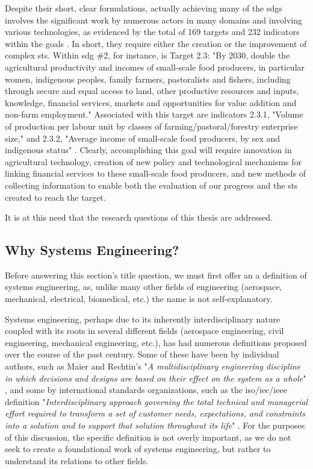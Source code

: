 Despite their short, clear formulations, actually achieving many of the \acp{sdg} involves the significant work by numerous actors in many domains and involving various technologies, as evidenced by the total of 169 targets and  232 indicators within the goals \cite{unitednationsgeneralassemblyGlobalIndicatorFramework2017}. In short, they require either the creation or the improvement of complex \ac{sts}. Within \ac{sdg} \#2, for instance, is Target 2.3: "By 2030, double the agricultural productivity and incomes of small-scale food producers, in particular women, indigenous peoples, family farmers, pastoralists and fishers, including through secure and equal access to land, other productive resources and inputs, knowledge, financial services, markets and opportunities for value addition and non-farm employment." Associated with this target are indicators 2.3.1, "Volume of production per labour unit by classes of farming/pastoral/forestry enterprise size," and 2.3.2, "Average income of small-scale food producers, by sex and indigenous status" \cite{unitednationsgeneralassemblyGlobalIndicatorFramework2017}. Clearly, accomplishing this goal will require innovation in agricultural technology, creation of new policy and technological mechanisms for linking financial services to these small-scale food producers, and new methods of collecting information to enable both the evaluation of our progress and the \ac{sts} created to reach the target. 

It is at this need that the research questions of this thesis are addressed.

\subsection{Why Systems Engineering?} \label{sec:se}

Before answering this section's title question, we must first offer an a definition of systems engineering, as, unlike many other fields of engineering (aerospace, mechanical, electrical, biomedical, etc.) the name is not self-explanatory. 

Systems engineering, perhaps due to its inherently interdisciplinary nature coupled with its roots in several different fields (aerospace engineering, civil engineering, mechanical engineering, etc.), has had numerous definitions proposed over the course of the past century. Some of these have been by individual authors, such as Maier and Rechtin's "\textit{A multidisciplinary engineering discipline in which decisions and designs are based on their effect on the system as a whole}" \cite{maierArtSystemsArchitecting2009}, and some by international standards organizations, such as the \ac{iso}/\ac{iec}/\ac{ieee} definition "\textit{Interdisciplinary approach governing the total technical and managerial effort required to transform a set of customer needs, expectations, and constraints into a solution and to support that solution throughout its life}" \cite{internationalorganizationforstandardizationSystemsSoftwareEngineering2010} . For the purposes of this discussion, the specific definition is not overly important, as we do not seek to create a foundational work of systems engineering, but rather to understand its relations to other fields.

